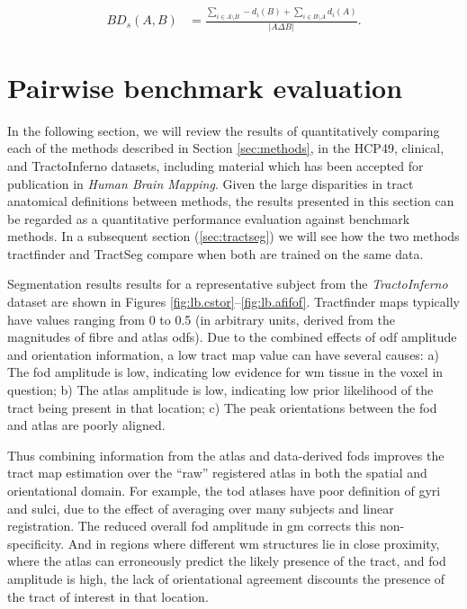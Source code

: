 \begin{align}
  BD_s(A,B) &= \frac{\sum_{i \in A\setminus B} - d_i(B) + \sum_{i \in B\setminus A} d_i(A)}{|A\Delta B|}. \label{eq:bds}
\end{align}


\section{Pairwise benchmark evaluation}
\label{sec:validation}

In the following section, we will review the results of quantitatively comparing each of the methods described in Section \ref{sec:methods}, in the HCP49, clinical, and TractoInferno datasets, including material which has been accepted for publication in \textit{Human Brain Mapping}\autocite{Young2024}.
Given the large disparities in tract anatomical definitions between methods, the results presented in this section can be regarded as a quantitative performance evaluation against benchmark methods.
In a subsequent section (\ref{sec:tractseg}) we will see how the two methods tractfinder and TractSeg compare when both are trained on the same data.

Segmentation results results for a representative subject from the \textit{TractoInferno} dataset are shown in Figures \ref{fig:lb.cstor}--\ref{fig:lb.afifof}.
Tractfinder maps typically have values ranging from 0 to 0.5 (in arbitrary units, derived from the magnitudes of fibre and atlas \glspl{odf}).
Due to the combined effects of \gls{odf} amplitude and orientation information, a low tract map value can have several causes:
a) The \gls{fod} amplitude is low, indicating low evidence for \gls{wm} tissue in the voxel in question;
b) The atlas amplitude is low, indicating low prior likelihood of the tract being present in that location;
c) The peak orientations between the \gls{fod} and atlas are poorly aligned.

Thus combining information from the atlas and data-derived \glspl{fod} improves the tract map estimation over the ``raw'' registered atlas in both the spatial and orientational domain. For example, the \gls{tod} atlases have poor definition of gyri and sulci, due to the effect of averaging over many subjects and linear registration. The reduced overall \gls{fod} amplitude in \gls{gm} corrects this non-specificity. And in regions where different \gls{wm} structures lie in close proximity, where the atlas can erroneously predict the likely presence of the tract, and \gls{fod} amplitude is high, the lack of orientational agreement discounts the presence of the tract of interest in that location.

